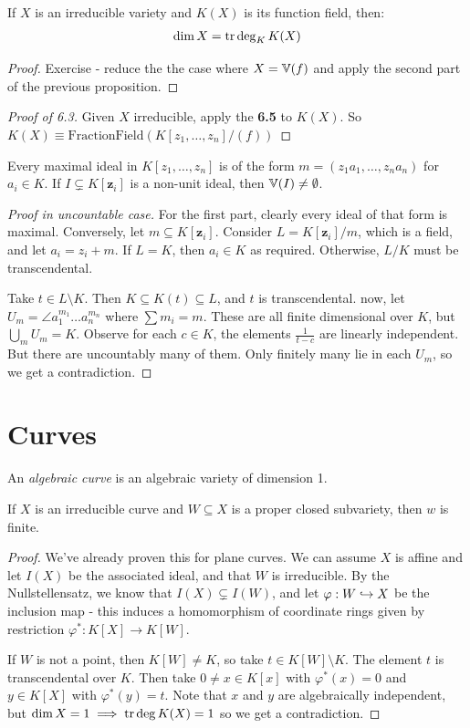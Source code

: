 \documentclass[10pt,a4paper,rgb]{article}
\begin{document}
\begin{corollary}
If $X$ is an irreducible variety and $K(X)$ is its function field, then:
\begin{align*}
\dim X = \operatorname{tr} \deg_K K(X)
\end{align*}
\end{corollary}
\begin{proof}
Exercise - reduce the the case where $X = \mathbb{V}(f)$ and apply the second part of the previous proposition.
\end{proof}
\begin{proof}[Proof of 6.3]
Given $X$ irreducible, apply the \textbf{6.5} to $K(X)$. So $K(X) \equiv \text{FractionField}(K[z_1, \ldots, z_n]/(f))$
\end{proof}
\begin{theorem}
Every maximal ideal in $K[z_1, \ldots, z_n]$ is of the form $m  = (z_1a_1, \ldots, z_na_n)$ for $a_i \in K$. If $I\subsetneq K[\mathbf{z}_i]$ is a non-unit ideal, then $\mathbb{V}(I) \neq \emptyset$.
\end{theorem}
\begin{proof}[Proof in uncountable case]
For the first part, clearly every ideal of that form is maximal. Conversely, let $m \subseteq K[\mathbf{z}_i]$. Consider $L = K[\mathbf{z}_i]/m$, which is a field, and let $a_i = z_i + m$. If $L = K$, then $a_i \in K$ as required. Otherwise, $L/K$ must be transcendental.

Take $t \in L\setminus K$. Then $K \subseteq K(t) \subseteq L$, and $t$ is transcendental. now, let $U_m = \angle{a_1^{m_1}\ldots a_n^{m_n}}$ where $\sum m_i = m$. These are all finite dimensional over $K$, but $\bigcup_m U_m = K$. Observe for each $c \in K$, the elements $\frac{1}{t-c}$ are linearly independent. But there are uncountably many of them. Only finitely many lie in each $U_m$, so we get a contradiction.
\end{proof}

\section{Curves}
An \emph{algebraic curve} is an algebraic variety of dimension 1. 
\begin{proposition}
If $X$ is an irreducible curve and $W \subseteq X$ is a proper closed subvariety, then $w$ is finite.
\end{proposition}
\begin{proof}
We've already proven this for plane curves. We can assume $X$ is affine and let $I(X)$ be the associated ideal, and that $W$ is irreducible. By the Nullstellensatz, we know that $I(X) \subsetneq I(W)$, and let $\varphi : W \hookrightarrow X$ be the inclusion map - this induces a homomorphism of coordinate rings given by restriction $\varphi^{\ast}: K[X] \to K[W]$.

If $W$ is not a point, then $K[W] \neq K$, so take $t \in K[W] \setminus K$. The element $t$ is transcendental over $K$. Then take $0 \neq x \in K[x]$ with $\varphi^{\ast}(x) = 0$ and $y \in K[X]$ with $\varphi^{\ast}(y) = t$. Note that $x$ and $y$ are algebraically independent, but $\dim X = 1\implies \operatorname{tr} \deg K(X) = 1$ so we get a contradiction.
\end{proof}
\end{document}
